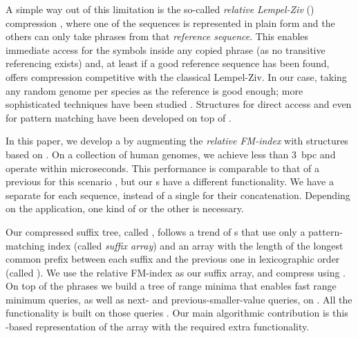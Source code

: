 A simple way out of this limitation is the so-called \emph{relative Lempel-Ziv}
(\RLZ) compression \cite{Kuruppu2010}, where one of the sequences is represented
in plain form and the others can only take phrases from that \emph{reference
sequence}. This enables immediate access for the symbols inside any copied
phrase (as no transitive referencing exists) and, at least if a good reference
sequence has been found, offers compression competitive with the
classical Lempel-Ziv. In our case, taking any random genome per species as the
reference is good enough; more sophisticated techniques have been studied
\cite{KPZ11,KBSCZ12,LPMW16}. Structures for direct access \cite{DG11,Ferrada2014}
and even for pattern matching \cite{DJSS14,Belazzougui2014} have been developed
on top of \RLZ.

In this paper, we develop a \CST{} by augmenting the \emph{relative FM-index}
\cite{Belazzougui2014} with structures based on \RLZ.
On a collection of human genomes, we achieve less than 3~bpc and operate
within microseconds. This performance is comparable to that of a previous \CST{}
for this scenario \cite{Navarro2015}, but our \CST{}s have a different
functionality. We have a separate \CST{} for each sequence, instead of a single
\CST{} for their concatenation. Depending on the application, one kind of \CST{} or
the other is necessary.

Our compressed suffix tree, called \RCST, follows a trend of \CST{}s
\cite{Fischer2009a,Ohlebusch2009,Fis10,Ohlebusch2010,Gog2011a,Abeliuk2013} that use only a pattern-matching index
(called \emph{suffix array}) and an array with the length of the longest common prefix
between each suffix and the previous one in lexicographic order (called \LCP).
We use the relative FM-index as our suffix array, and
compress \LCP{} using \RLZ. On top of the \RLZ{} phrases we build a tree
of range minima that enables fast range minimum queries, as well as
next- and previous-smaller-value queries, on \LCP{} \cite{Abeliuk2013}. All the \CST{} functionality
is built on those queries \cite{Fischer2009a}. Our main algorithmic contribution
is this \RLZ\nobreakdash-based representation of the \LCP{} array with the required extra
functionality.

